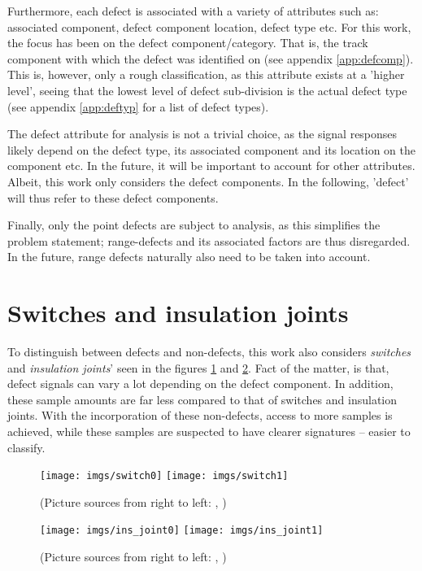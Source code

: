 \raggedbottom %
Furthermore, each defect is associated with a variety of attributes such as: associated component, defect component location, defect type etc. For this work, the focus has been on the defect component/category. That is, the track component with which the defect was identified on (see appendix \ref{app:defcomp}). This is, however, only a rough classification, as this attribute exists at a 'higher level', seeing that the lowest level of defect sub-division is the actual defect type (see appendix \ref{app:deftyp} for a list of defect types).

The defect attribute for analysis is not a trivial choice, as the signal responses likely depend on the defect type, its associated component and its location on the component etc. In the future, it will be important to account for other attributes. Albeit, this work only considers the defect components. In the following, 'defect' will thus refer to these defect components.

Finally, only the point defects are subject to analysis, as this simplifies the problem statement; range-defects and its associated factors are thus disregarded. In the future, range defects naturally also need to be taken into account.

\section{Switches and insulation joints}
To distinguish between defects and non-defects, this work also considers \textit{switches} and \textit{insulation joints}' seen in the figures \ref{fig:swi} and \ref{fig:ins}. Fact of the matter, is that, defect signals can vary a lot depending on the defect component. In addition, these sample amounts are far less compared to that of switches and insulation joints. With the incorporation of these non-defects, access to more samples is achieved, while these samples are suspected to have clearer signatures -- easier to classify.

\begin{figure}[H]
	\centering
	\texttt{[image: imgs/switch0]}
	\texttt{[image: imgs/switch1]}
	\caption{(Picture sources from right to left: \cite{swi0:online}, \cite{swi1:online})}
	\label{fig:swi}
\end{figure}
\begin{figure}[H]
	\centering
	\texttt{[image: imgs/ins\_joint0]}
	\texttt{[image: imgs/ins\_joint1]}
	\caption{(Picture sources from right to left: \cite{ins0:online}, \cite{ins1:online})}
	\label{fig:ins}
\end{figure}

